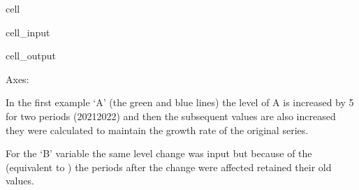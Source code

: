 \documentclass[letterpaper,10pt,english]{jupyterBook}
\begin{document}
\begin{sphinxuseclass}{cell}\begin{sphinxVerbatimInput}

\begin{sphinxuseclass}{cell_input}
\begin{sphinxVerbatim}[commandchars=\\\{\}]

\PYG{p}{[}\PYG{p}{[}\PYG{p}{]}\PYG{p}{]}
    
\end{sphinxVerbatim}

\end{sphinxuseclass}\end{sphinxVerbatimInput}
\begin{sphinxVerbatimOutput}

\begin{sphinxuseclass}{cell_output}
\begin{sphinxVerbatim}[commandchars=\\\{\}]
\PYGZlt{}Axes: \PYGZgt{}
\end{sphinxVerbatim}

\noindent{}

\end{sphinxuseclass}\end{sphinxVerbatimOutput}

\end{sphinxuseclass}
\sphinxAtStartPar
In the first example ‘A’ (the green and blue lines) the level of A is increased by 5 for two periods (2021\sphinxhyphen{}2022) and then the subsequent values are also increased they were calculated to maintain the growth rate of the original series.

\sphinxAtStartPar
For the ‘B’ variable the same level change was input but because of the  (equivalent to  ) the periods after the change were affected retained their old values.
\end{document}
